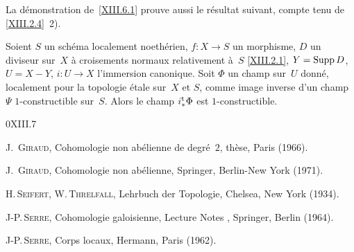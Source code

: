 La d\'emonstration de~\ref{XIII.6.1} prouve aussi le r\'esultat
suivant, compte tenu de \ref{XIII.2.4}~2).

\begin{corollaire}
\label{XIII.6.3}
Soient $S$ un sch\'ema localement noeth\'erien, $f\colon X\to S$ un
morphisme, $D$ un diviseur sur~$X$ \`a croisements normaux
relativement \`a~$S$ \eqref{XIII.2.1}, $Y=\operatorname{Supp} D$, $U=X-Y$,
$i\colon U\to X$ l'immersion canonique. Soit $\Phi$ un champ sur~$U$
donn\'e, localement pour la topologie \'etale sur~$X$ et $S$,
comme image inverse d'un champ $\Psi$ $1$-constructible sur~$S$. Alors
le champ $i_*^{\mathrm{t}}\Phi$ est $1$-constructible.
\end{corollaire}


\begin{thebibliography}{0}{XIII.7}

 J.\, \textsc{Giraud}, Cohomologie non ab\'elienne de
degr\'e~$2$, th\`ese, Paris (1966).

 J.\, \textsc{Giraud},
Cohomologie non ab\'elienne, Springer, Berlin-New York (1971).

H.\,\textsc{Seifert}, W.\,\textsc{Threlfall}, Lehrbuch der Topologie, Chelsea, New
York (1934).


J-P.\,\textsc{Serre}, Cohomologie galoisienne, Lecture Notes
, Springer, Berlin (1964).

J-P.\,\textsc{Serre}, Corps locaux, Hermann, Paris (1962).
\end{thebibliography}

